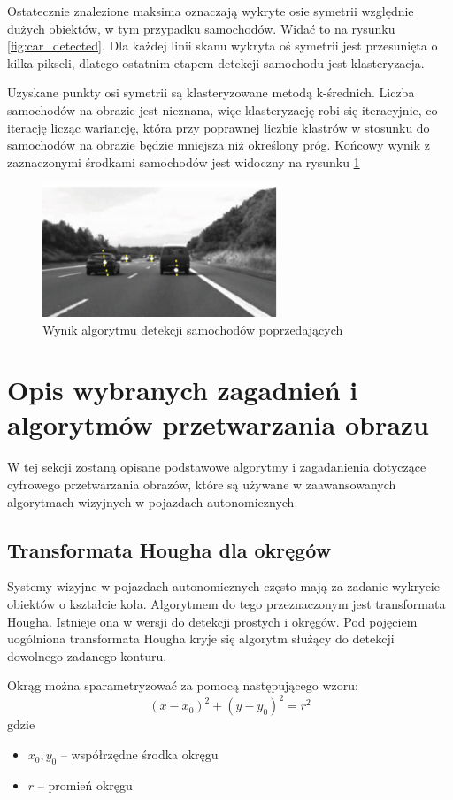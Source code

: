 Ostatecznie znalezione maksima oznaczają wykryte osie symetrii względnie dużych obiektów, w tym przypadku samochodów. Widać to na rysunku \ref{fig:car_detected}. Dla każdej linii skanu wykryta oś symetrii jest przesunięta o kilka pikseli, dlatego ostatnim etapem detekcji samochodu jest klasteryzacja.

Uzyskane punkty osi symetrii są klasteryzowane metodą k-średnich. Liczba samochodów na obrazie jest nieznana, więc klasteryzację robi się iteracyjnie, co iterację licząc wariancję, która przy poprawnej liczbie klastrów w stosunku do samochodów na obrazie będzie mniejsza niż określony próg. Końcowy wynik z zaznaczonymi środkami samochodów jest widoczny na rysunku \ref{fig:car_end}

\begin{figure}
  \centering
  \includegraphics[width=7cm]{img/car_end.png}
  \caption{Wynik algorytmu detekcji samochodów poprzedających\cite{T1}}
  \label{fig:car_end}
\end{figure}

\section{Opis wybranych zagadnień i algorytmów przetwarzania obrazu}
\label{sec:vision_algs}
W tej sekcji zostaną opisane podstawowe algorytmy i zagadanienia dotyczące cyfrowego przetwarzania obrazów, które są używane w zaawansowanych algorytmach wizyjnych w pojazdach autonomicznych.

\subsection{Transformata Hougha dla okręgów}

Systemy wizyjne w pojazdach autonomicznych często mają za zadanie wykrycie obiektów o kształcie koła. Algorytmem do tego przeznaczonym jest transformata Hougha. Istnieje ona w wersji do detekcji prostych i okręgów. Pod pojęciem uogólniona transformata Hougha kryje się algorytm służący do detekcji dowolnego zadanego konturu.

Okrąg można sparametryzować za pomocą następującego wzoru:
\begin{equation}
(x-x_0)^2+(y-y_0)^2=r^2
\end{equation}
gdzie
\begin{itemize}
\item $x_0, y_0$ -- współrzędne środka okręgu
\item $r$ -- promień okręgu
\end{itemize}

